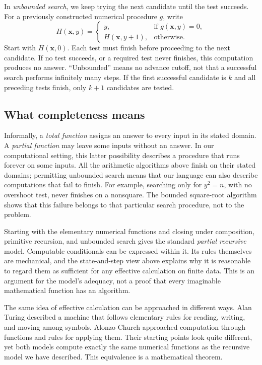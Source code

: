 In \emph{unbounded search}, we keep trying the next candidate until the test
succeeds. For a previously constructed numerical procedure $g$, write
\[
H(\mathbf{x},y)=\begin{cases}
y,&\text{if }g(\mathbf{x},y)=0,\\
H(\mathbf{x},y+1),&\text{otherwise}.
\end{cases}
\]
Start with $H(\mathbf{x},0)$. Each test must finish before proceeding to the
next candidate. If no test succeeds, or a required test never finishes, this
computation produces no answer. ``Unbounded'' means no advance cutoff, not
that a successful search performs infinitely many steps. If the first
successful candidate is $k$ and all preceding tests finish, only $k+1$
candidates are tested.

\subsection{What completeness means}

Informally, a \emph{total function} assigns an answer to every input in its
stated domain. A \emph{partial function} may leave some inputs without an
answer. In our computational setting, this latter possibility describes a
procedure that runs forever on some inputs. All the arithmetic algorithms
above finish on their stated domains; permitting unbounded search means
that our language can also describe computations that fail to finish.
For example, searching only for $y^2=n$, with no overshoot test, never
finishes on a nonsquare. The bounded square-root algorithm shows that this
failure belongs to that particular search procedure, not to the problem.

Starting with the elementary numerical functions and closing under
composition, primitive recursion, and unbounded search gives the standard
\emph{partial recursive} model. Computable conditionals can be expressed
within it. Its rules themselves are mechanical, and the state-and-step
view above explains why it is reasonable to regard them as sufficient for
any effective calculation on finite data. This is an argument for the
model's adequacy, not a proof that every imaginable mathematical function
has an algorithm.

The same idea of effective calculation can be approached in different ways.
Alan Turing described a machine that follows elementary rules for reading,
writing, and moving among symbols. Alonzo Church approached computation
through functions and rules for applying them. Their starting points look
quite different, yet both models compute exactly the same numerical
functions as the recursive model we have described. This equivalence is a
mathematical theorem.

